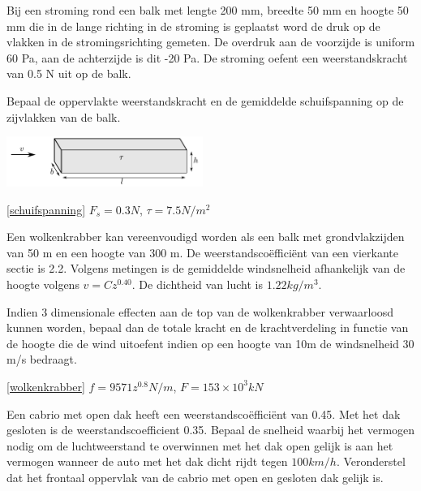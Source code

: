 \begin{toepassing}
	\label{schuifspanning}
Bij een stroming rond een balk met lengte 200 mm, breedte 50 mm en hoogte 50 mm die in de lange richting in de stroming is geplaatst word de druk op de vlakken in de stromingsrichting gemeten. De overdruk aan de voorzijde is uniform 60 Pa, aan de achterzijde is dit -20 Pa. De stroming oefent een weerstandskracht van 0.5 N uit op de balk.

Bepaal de oppervlakte weerstandskracht en de gemiddelde schuifspanning op de zijvlakken van de balk.

	\centering
	\includegraphics[width=0.48\textwidth]{fig/uitwendige_stroming/schuifspanning.pdf}
\end{toepassing}
\begin{antwoord}{\ref{schuifspanning}}
	$F_s = 0.3 \unit{N}$, $\tau = 7.5 \unit{N/m^2}$
\end{antwoord}
\begin{toepassing}[*]
	\label{wolkenkrabber}
Een wolkenkrabber kan vereenvoudigd worden als een balk met grondvlakzijden van 50 m en een hoogte van 300 m. De weerstandscoëfficiënt van een vierkante sectie is 2.2. Volgens metingen is de gemiddelde windsnelheid afhankelijk van de hoogte volgens $v = C z^{0.40}$. De dichtheid van lucht is $1.22 \unit{kg/m^3}$.

Indien 3 dimensionale effecten aan de top van de wolkenkrabber verwaarloosd kunnen worden, bepaal dan de totale kracht en de krachtverdeling in functie van de hoogte die de wind uitoefent indien op een hoogte van 10m de windsnelheid 30 m/s bedraagt.
\end{toepassing}
\begin{antwoord}{\ref{wolkenkrabber}}
	$f = 9571 z^{0.8} \unit{N/m}$, $F = 153 \times 10^3 \unit{kN}$
\end{antwoord}
\begin{toepassing}
	\label{cabrio}
Een cabrio met open dak heeft een weerstandscoëfficiënt van 0.45. Met het dak gesloten is de weerstandscoefficient 0.35.
Bepaal de snelheid waarbij het vermogen nodig om de luchtweerstand te overwinnen met het dak open gelijk is aan het vermogen wanneer de auto met het dak dicht rijdt tegen $100 \unit{km/h}$. Veronderstel dat het frontaal oppervlak van de cabrio met open en gesloten dak gelijk is.
\end{toepassing}
